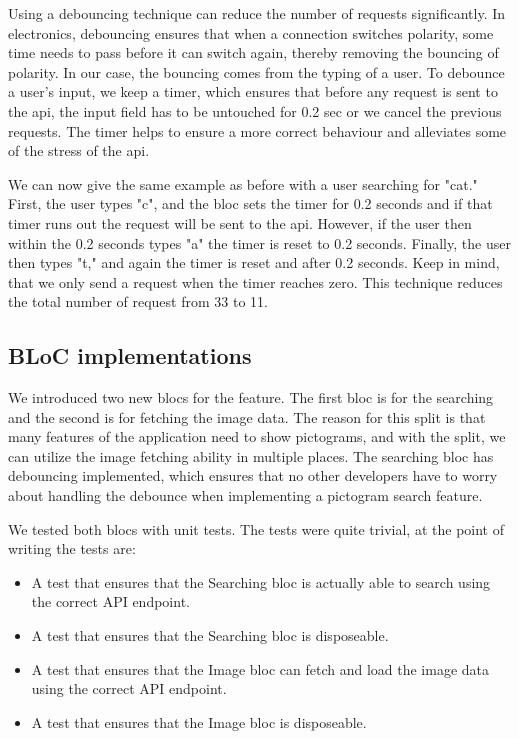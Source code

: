 Using a debouncing technique can reduce the number of requests significantly. In electronics, debouncing ensures that when a connection switches polarity, some time needs to pass before it can switch again, thereby removing the bouncing of polarity. In our case, the bouncing comes from the typing of a user. To debounce a user's input, we keep a timer, which ensures that before any request is sent to the \gls{api}, the input field has to be untouched for 0.2 sec or we cancel the previous requests. The timer helps to ensure a more correct behaviour and alleviates some of the stress of the \gls{api}.

We can now give the same example as before with a user searching for "cat." First, the user types "c", and the \gls{bloc} sets the timer for 0.2 seconds and if that timer runs out the request will be sent to the \gls{api}. However, if the user then within the 0.2 seconds types "a" the timer is reset to 0.2 seconds. Finally, the user then types "t," and again the timer is reset and after 0.2 seconds. Keep in mind, that we only send a request when the timer reaches zero. This technique reduces the total number of request from 33 to 11.

\subsection{BLoC implementations}
We introduced two new \glspl{bloc} for the feature. The first \gls{bloc} is for the searching and the second is for fetching the image data. The reason for this split is that many features of the application need to show pictograms, and with the split, we can utilize the image fetching ability in multiple places. The searching \gls{bloc} has debouncing implemented, which ensures that no other developers have to worry about handling the debounce when implementing a pictogram search feature.

We tested both \glspl{bloc} with unit tests. The tests were quite trivial, at the point of writing the tests are:

\begin{itemize}
  \item A test that ensures that the Searching \gls{bloc} is actually able to search using the correct API endpoint.
  \item A test that ensures that the Searching \gls{bloc} is disposeable.
  \item A test that ensures that the Image \gls{bloc} can fetch and load the image data using the correct API endpoint.
  \item A test that ensures that the Image \gls{bloc} is disposeable.
\end{itemize}

